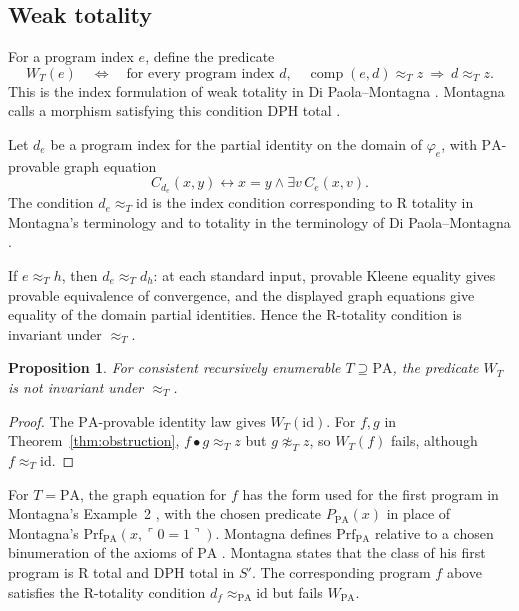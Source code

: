 \documentclass[11pt]{article}
\newtheorem{proposition}[theorem]{Proposition}
\newcommand{\PA}{\mathrm{PA}}
\newcommand{\comp}{\operatorname{comp}}
\begin{document}
\subsection{Weak totality}

For a program index $e$, define the predicate
\begin{equation}\label{eq:weak}
 W_T(e)\quad\Longleftrightarrow\quad
 \text{for every program index }d,\quad
 \comp(e,d)\approx_Tz\ \Longrightarrow\ d\approx_Tz.
\end{equation}
This is the index formulation of weak totality in Di Paola--Montagna
\cite[Definition~1.5, p.~645]{DiPaolaMontagna}. Montagna calls a morphism
satisfying this condition DPH total \cite[Definition~1.1, p.~106]{Montagna}.

Let $d_e$ be a program index for the partial identity on the domain of
$\varphi_e$, with $\PA$-provable graph equation
\[
 C_{d_e}(x,y)\longleftrightarrow x=y\land\exists v\,C_e(x,v).
\]
The condition $d_e\approx_T\mathrm{id}$ is the index condition
corresponding to R totality in Montagna's terminology
\cite[Definitions~1.6--1.7, p.~107]{Montagna} and to totality in the
terminology of Di Paola--Montagna
\cite[Definition~1.4, p.~645]{DiPaolaMontagna}.

If $e\approx_T h$, then $d_e\approx_T d_h$: at each standard input,
provable Kleene equality gives provable equivalence of convergence,
and the displayed graph equations give equality of the domain partial
identities. Hence the R-totality condition is invariant under $\approx_T$.

\begin{proposition}\label{prop:weak}
For consistent recursively enumerable $T\supseteq\PA$, the predicate
$W_T$ is not invariant under $\approx_T$.
\end{proposition}

\begin{proof}
The $\PA$-provable identity law gives $W_T(\mathrm{id})$.
For $f,g$ in Theorem~\ref{thm:obstruction},
$f\bullet g\approx_Tz$ but $g\not\approx_Tz$, so $W_T(f)$ fails,
although $f\approx_T\mathrm{id}$.
\end{proof}

For $T=\PA$, the graph equation for $f$ has the form used for the first
program in Montagna's Example~2 \cite[p.~112]{Montagna}, with the chosen
predicate $P_{\PA}(x)$ in place of Montagna's
$\mathrm{Prf}_{\PA}(x,\ulcorner0=1\urcorner)$. Montagna defines
$\mathrm{Prf}_{\PA}$ relative to a chosen binumeration of the axioms of
$\PA$ \cite[note~2, p.~115]{Montagna}. Montagna states that the class of
his first program is R total and DPH total in $S'$. The corresponding
program $f$ above satisfies the R-totality condition
$d_f\approx_{\PA}\mathrm{id}$ but fails $W_{\PA}$.
\end{document}
